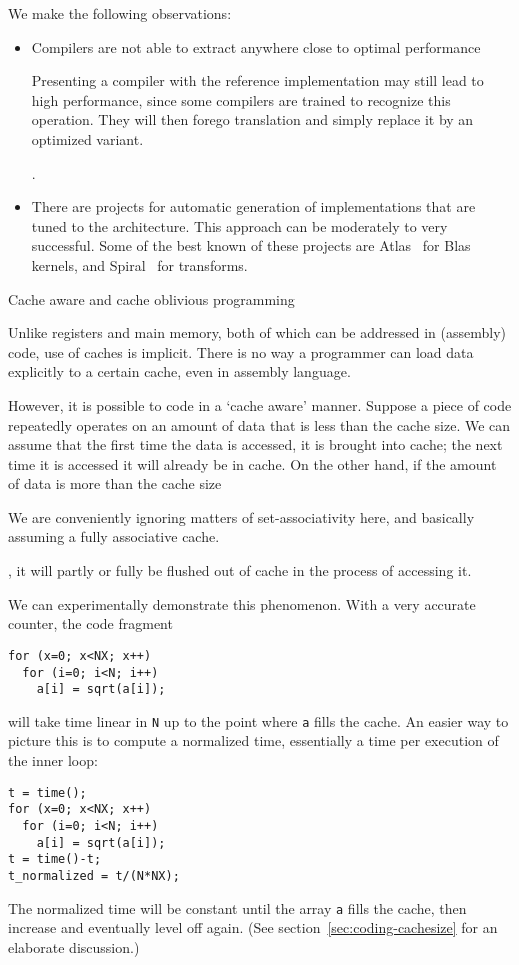 We make the following observations:
\begin{itemize}
\item Compilers are not able to extract anywhere close
  to optimal performance
  \begin{footnoteenv}
    {Presenting a compiler with the
    reference implementation may still lead to high performance, since
    some compilers are trained to recognize this operation. They will
    then forego translation and simply replace it by an optimized
    variant.}
  \end{footnoteenv}
  .
\item There are  projects for automatic
  generation of implementations that are tuned to the
  architecture. This approach can be moderately to very
  successful. Some of the best known of these projects are
  Atlas~\cite{atlas-parcomp} for Blas kernels, and
  Spiral~\cite{spiral} for transforms.
\end{itemize}

 {Cache aware and cache oblivious programming}

Unlike registers and main memory, both of
which can be addressed in (assembly) code, use of caches is
implicit. There is no way a programmer can load data explicitly to a
certain cache, even in assembly language. 

However, it is possible to code in a `cache aware' manner. Suppose a
piece of code repeatedly operates on an amount of data that is less
than the cache size. We can assume that the first time the data is
accessed, it is brought into cache; the next time it is accessed it
will already be in cache. On the other hand, if the amount of data is
more than the cache size
\begin{footnoteenv}
  {We are conveniently ignoring matters
  of set-associativity here, and basically assuming a fully
  associative cache.}
\end{footnoteenv}
, it will partly or fully be flushed out of cache
in the process of accessing it.

We can experimentally demonstrate this phenomenon. With a very
accurate counter, the code fragment
\begin{verbatim}
for (x=0; x<NX; x++)
  for (i=0; i<N; i++)
    a[i] = sqrt(a[i]);
\end{verbatim}
will take time linear in \texttt{N} up to the point where \texttt{a}
fills the cache. An easier way to picture this is to compute a
normalized time, essentially a time per execution of the inner loop:
\begin{verbatim}
t = time();
for (x=0; x<NX; x++)
  for (i=0; i<N; i++)
    a[i] = sqrt(a[i]);
t = time()-t;
t_normalized = t/(N*NX);
\end{verbatim}
The normalized time will be constant until the array \texttt{a} fills
the cache, then increase and eventually level off again. (See
section~\ref{sec:coding-cachesize} for an elaborate discussion.)

